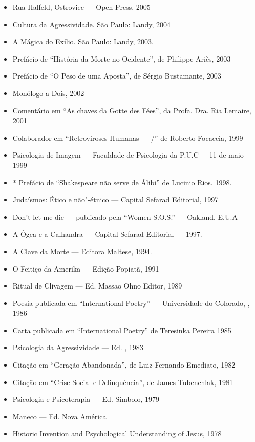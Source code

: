 \begin{itemize}
\item
  Rua Halfeld, Ostroviec --- Open Press, 2005
\item
  Cultura da Agressividade. São Paulo: Landy, 2004
\item
  A Mágica do Exílio. São Paulo: Landy, 2003.
\item
  Prefácio de ``História da Morte no Ocidente'', de Philippe Ariès, 2003
\item
  Prefácio de ``O Peso de uma Aposta'', de Sérgio Bustamante, 2003
\item
  Monólogo a Dois, 2002
\item
  Comentário em ``As chaves da Gotte des Fées'', da Profa. Dra. Ria
  Lemaire, 2001
\item
  Colaborador em ``Retroviroses Humanas --- /'' de Roberto
  Focaccia, 1999
\item
  Psicologia de Imagem --- Faculdade de Psicologia da P.U.C\,--- 11 de
  maio 1999
\item
  * Prefácio de ``Shakespeare não serve de Álibi'' de Lucinio Rios.
  1998.
\item
  Judaísmos: Ético e não"-étnico --- Capital Sefarad Editorial, 1997
\item
  Don't let me die --- publicado pela ``Women S.O.S.'' --- Oakland,
  E.U.A\,\item
  A Ógea e a Calhandra --- Capital Sefarad Editorial --- 1997.
\item
  A Clave da Morte --- Editora Maltese, 1994.
\item
  O Feitiço da Amerika --- Edição Popiatã, 1991
\item
  Ritual de Clivagem --- Ed. Massao Ohno Editor, 1989
\item
  Poesia publicada em ``International Poetry'' --- Universidade do
  Colorado, , 1986
\item
  Carta publicada em ``International Poetry'' de Teresinka Pereira 1985
\item
  Psicologia da Agressividade --- Ed. , 1983
\item
  Citação em ``Geração Abandonada'', de Luiz Fernando Emediato, 1982
\item
  Citação em ``Crise Social e Delinquência'', de James Tubenchlak, 1981
\item
  Psicologia e Psicoterapia --- Ed. Símbolo, 1979
\item
  Maneco --- Ed. Nova América
\item
  Historic Invention and Psychological Understanding of Jesus, 1978

\end{itemize}
